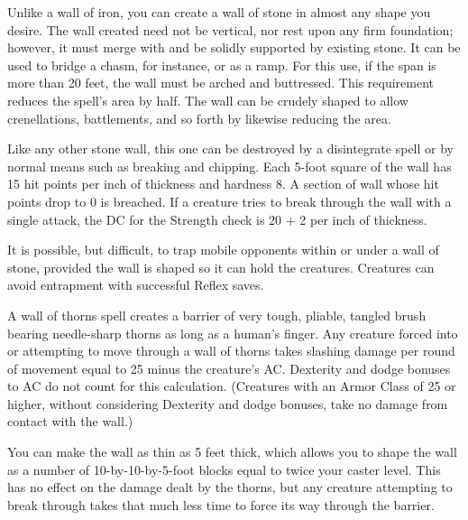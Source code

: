 \begin{multicols}{2}
\begin{small}
\smallskip\noindent Unlike a wall of iron, you can create a wall of stone in almost any shape you desire. The wall created need not be vertical, nor rest upon any firm foundation; however, it must merge with and be solidly supported by existing stone. It can be used to bridge a chasm, for instance, or as a ramp. For this use, if the span is more than 20 feet, the wall must be arched and buttressed. This requirement reduces the spell's area by half. The wall can be crudely shaped to allow crenellations, battlements, and so forth by likewise reducing the area.

\smallskip\noindent Like any other stone wall, this one can be destroyed by a disintegrate spell or by normal means such as breaking and chipping. Each 5-foot square of the wall has 15 hit points per inch of thickness and hardness 8. A section of wall whose hit points drop to 0 is breached. If a creature tries to break through the wall with a single attack, the DC for the Strength check is 20 + 2 per inch of thickness.

\smallskip\noindent It is possible, but difficult, to trap mobile opponents within or under a wall of stone, provided the wall is shaped so it can hold the creatures. Creatures can avoid entrapment with successful Reflex saves.


\noindent A wall of thorns spell creates a barrier of very tough, pliable, tangled brush bearing needle-sharp thorns as long as a human's finger. Any creature forced into or attempting to move through a wall of thorns takes slashing damage per round of movement equal to 25 minus the creature's AC. Dexterity and dodge bonuses to AC do not count for this calculation. (Creatures with an Armor Class of 25 or higher, without considering Dexterity and dodge bonuses, take no damage from contact with the wall.)

\smallskip\noindent You can make the wall as thin as 5 feet thick, which allows you to shape the wall as a number of 10-by-10-by-5-foot blocks equal to twice your caster level. This has no effect on the damage dealt by the thorns, but any creature attempting to break through takes that much less time to force its way through the barrier.


\end{small}
\end{multicols}
